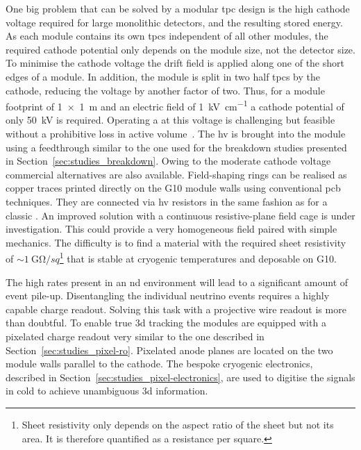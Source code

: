 One big problem that can be solved by a modular \gls{tpc} design is the high cathode voltage required for large monolithic detectors, and the resulting stored energy.
As each module contains its own \glspl{tpc} independent of all other modules, the required cathode potential only depends on the module size, not the detector size.
To minimise the cathode voltage the drift field is applied along one of the short edges of a module.
In addition, the module is split in two half \glspl{tpc} by the cathode, reducing the voltage by another factor of two.
Thus, for a module footprint of \SI{1 x 1}{\metre} and an electric field of \SI{1}{\kilo\volt\per\centi\metre} a cathode potential of only \SI{50}{\kilo\volt} is required.
Operating a \lartpc{} at this voltage is challenging but feasible without a prohibitive loss in active volume~\cite{AT}.
The \gls{hv} is brought into the module using a feedthrough similar to the one used for the breakdown studies presented in Section~\ref{sec:studies_breakdown}.
Owing to the moderate cathode voltage commercial alternatives are also available.
Field-shaping rings can be realised as copper traces printed directly on the G10 module walls using conventional \gls{pcb} techniques.
They are connected via \gls{hv} resistors in the same fashion as for a classic \lartpc{}.
An improved solution with a continuous resistive-plane field cage is under investigation.
This could provide a very homogeneous field paired with simple mechanics.
The difficulty is to find a material with the required sheet resistivity of $\sim{\SI{1}{\giga\ohm\per sq}}$\footnote{Sheet resistivity only depends on the aspect ratio of the sheet but not its area. It is therefore quantified as a resistance per square.} that is stable at cryogenic temperatures and deposable on G10.

The high rates present in an \gls{nd} environment will lead to a significant amount of event pile-up.
Disentangling the individual neutrino events requires a highly capable charge readout.
Solving this task with a projective wire readout is more than doubtful.
To enable true \gls{3d} tracking the modules are equipped with a pixelated charge readout very similar to the one described in Section~\ref{sec:studies_pixel-ro}.
Pixelated anode planes are located on the two module walls parallel to the cathode.
The bespoke \larpix{} cryogenic electronics, described in Section~\ref{sec:studies_pixel-electronics}, are used to digitise the signals in cold to achieve unambiguous \gls{3d} information.

